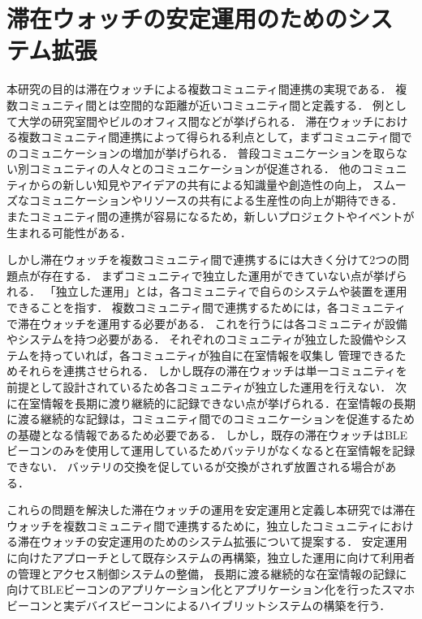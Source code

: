 \section{滞在ウォッチの安定運用のためのシステム拡張}\label{1.2}

本研究の目的は滞在ウォッチによる複数コミュニティ間連携の実現である．
複数コミュニティ間とは空間的な距離が近いコミュニティ間と定義する．
例として大学の研究室間やビルのオフィス間などが挙げられる．
滞在ウォッチにおける複数コミュニティ間連携によって得られる利点として，まずコミュニティ間でのコミュニケーションの増加が挙げられる．
普段コミュニケーションを取らない別コミュニティの人々とのコミュニケーションが促進される．
他のコミュニティからの新しい知見やアイデアの共有による知識量や創造性の向上，
スムーズなコミュニケーションやリソースの共有による生産性の向上が期待できる．
またコミュニティ間の連携が容易になるため，新しいプロジェクトやイベントが生まれる可能性がある．

しかし滞在ウォッチを複数コミュニティ間で連携するには大きく分けて2つの問題点が存在する．
まずコミュニティで独立した運用ができていない点が挙げられる．
「独立した運用」とは，各コミュニティで自らのシステムや装置を運用できることを指す．
複数コミュニティ間で連携するためには，各コミュニティで滞在ウォッチを運用する必要がある．
これを行うには各コミュニティが設備やシステムを持つ必要がある．
それぞれのコミュニティが独立した設備やシステムを持っていれば，各コミュニティが独自に在室情報を収集し
管理できるためそれらを連携させられる．
しかし既存の滞在ウォッチは単一コミュニティを前提として設計されているため各コミュニティが独立した運用を行えない．
次に在室情報を長期に渡り継続的に記録できない点が挙げられる．在室情報の長期に渡る継続的な記録は，コミュニティ間でのコミュニケーションを促進するための基礎となる情報であるため必要である．
しかし，既存の滞在ウォッチはBLEビーコンのみを使用して運用しているためバッテリがなくなると在室情報を記録できない．
バッテリの交換を促しているが交換がされず放置される場合がある．

これらの問題を解決した滞在ウォッチの運用を安定運用と定義し本研究では滞在ウォッチを複数コミュニティ間で連携するために，独立したコミュニティにおける滞在ウォッチの安定運用のためのシステム拡張について提案する．
安定運用に向けたアプローチとして既存システムの再構築，独立した運用に向けて利用者の管理とアクセス制御システムの整備，
長期に渡る継続的な在室情報の記録に向けてBLEビーコンのアプリケーション化とアプリケーション化を行ったスマホビーコンと実デバイスビーコンによるハイブリットシステムの構築を行う．





